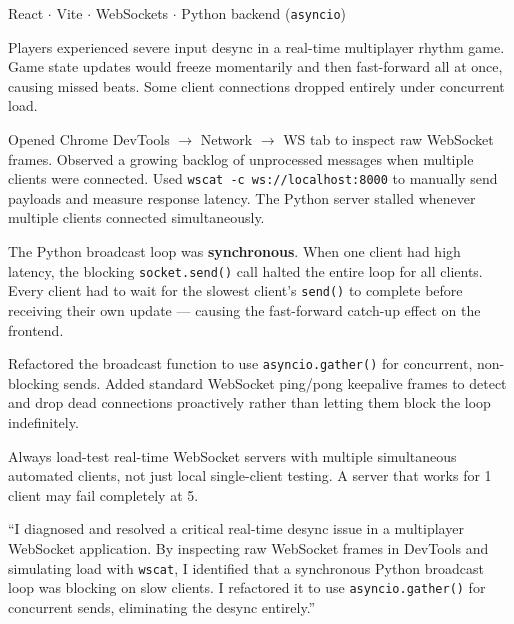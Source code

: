 \documentclass[11pt, letterpaper]{article}
\begin{document}
\begin{tcolorbox}[colback=logbg, colframe=logborder, arc=3pt, boxrule=1pt]
\begin{description}[noitemsep, leftmargin=2cm, style=nextline]
  \item[\textbf{Stack}] React $\cdot$ Vite $\cdot$ WebSockets $\cdot$ Python backend (\texttt{asyncio})
  \item[\textbf{Symptom}] Players experienced severe input desync in a real-time multiplayer rhythm game. Game state updates would freeze momentarily and then fast-forward all at once, causing missed beats. Some client connections dropped entirely under concurrent load.
  \item[\textbf{Diagnosis}] Opened Chrome DevTools $\to$ Network $\to$ WS tab to inspect raw WebSocket frames. Observed a growing backlog of unprocessed messages when multiple clients were connected. Used \texttt{wscat -c ws://localhost:8000} to manually send payloads and measure response latency. The Python server stalled whenever multiple clients connected simultaneously.
  \item[\textbf{Root Cause}] The Python broadcast loop was \textbf{synchronous}. When one client had high latency, the blocking \texttt{socket.send()} call halted the entire loop for all clients. Every client had to wait for the slowest client's \texttt{send()} to complete before receiving their own update --- causing the fast-forward catch-up effect on the frontend.
  \item[\textbf{Fix}] Refactored the broadcast function to use \texttt{asyncio.gather()} for concurrent, non-blocking sends. Added standard WebSocket ping/pong keepalive frames to detect and drop dead connections proactively rather than letting them block the loop indefinitely.
  \item[\textbf{Prevention}] Always load-test real-time WebSocket servers with multiple simultaneous automated clients, not just local single-client testing. A server that works for 1 client may fail completely at 5.
  \item[\textbf{STAR summary}] ``I diagnosed and resolved a critical real-time desync issue in a multiplayer WebSocket application. By inspecting raw WebSocket frames in DevTools and simulating load with \texttt{wscat}, I identified that a synchronous Python broadcast loop was blocking on slow clients. I refactored it to use \texttt{asyncio.gather()} for concurrent sends, eliminating the desync entirely.''
\end{description}
\end{tcolorbox}
\end{document}
